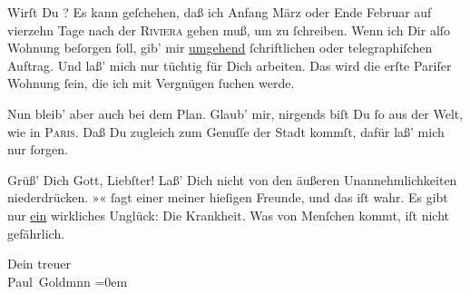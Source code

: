 \pstart
           Wirſt Du \label{K_L02803-2v}\label{K_L02803-2}? Es kann geſchehen, daß ich
               Anfang März oder Ende Februar
               auf vierzehn Tage nach der \textsc{Riviera} gehen muß, um \label{K_L02803-3v}\label{K_L02803-3} zu{ }ſchreiben. Wenn ich Dir alſo Wohnung beſorgen{ }ſoll, gib’ mir \uline{umgehend}{ }ſchriftlichen oder telegraphiſchen Auftrag.
               Und laß’ mich nur tüchtig für Dich arbeiten. {\pb}Das
               wird die erſte Pariſer Wohnung{ }ſein, die ich mit
               Vergnügen{ }ſuchen werde.\pend
           
\pstart
           Nun bleib’ aber auch bei dem Plan. Glaub’ mir, nirgends biſt Du{ }ſo aus der Welt, wie
               in \textsc{Paris}. Daß Du zugleich zum Genuſſe der Stadt kommſt, dafür laß’ mich nur ſorgen.\pend
           
\pstart
           Grüß’ Dich Gott, Liebſter! Laß’ Dich nicht von den äußeren Unannehmlichkeiten
               niederdrücken. »\label{K_L02803-4v}\label{K_L02803-4}«{ }ſagt einer meiner hieſigen Freunde, und das iſt wahr. {\pb}Es gibt nur \uline{ein}
               wirkliches Unglück: Die Krankheit. Was von Menſchen kommt, iſt nicht gefährlich.\pend
           
\pstart
           Dein treuer {\\[\baselineskip]}\spacefill\mbox{Paul Goldmnn}\pend
           \leftskip=0em{}\endnumbering{}  \newcommand{\dateiname}{L02803}\newcommand{\titel}{Paul Goldmann an Arthur Schnitzler, 16. 2. [1897]}\newcommand{\editorInnen}{Martin Anton Müller und Laura Untner}
